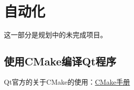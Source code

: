 \chapter{自动化}
这一部分是规划中的未完成项目。
\section{使用CMake编译Qt程序}
Qt官方的关于CMake的使用：\href{https://doc.qt.io/qt-5/cmake-manual.html}{CMake手册}